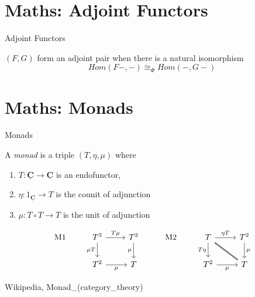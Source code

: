 \documentclass[10pt]{beamer}
\newcommand{\Cat}[1]{\ensuremath{\underline{\mathbf{#1}}}}
\theoremstyle{definition}
\theoremstyle{remark}
\numberwithin{equation}{section}
\begin{document}
\section{Maths: Adjoint Functors}

\begin{frame}[fragile]{Adjoint Functors}

$(F,G)$ form an adjoint pair when there is a natural isomorphism
  \[
  Hom(F-,-) \cong_{\Phi} Hom(-,G-)
  \]
  
\end{frame}


\section{Maths: Monads}

\begin{frame}[fragile]{Monads}

  A \emph{monad} is a triple $(T,\eta,\mu)$ where
  \begin{enumerate}
  \item $T: \Cat{C}\to \Cat{C}$ is an endofunctor,
  \item $\eta: 1_{\Cat{C}} \to T$ is the counit of adjunction
  \item $\mu: T \circ T \rightarrow T$ is the unit of adjunction
  \end{enumerate}

  \[
  \begin{tikzcd}
    \mathrm{M1} & T^3 \arrow{d}[swap]{\mu T}\arrow{r}{T\mu}  & T^2 \arrow{d}[swap]{\mu} &
    \mathrm{M2} & T \arrow{d}[swap]{T\eta}\arrow{r}{\eta T}\arrow[dash,double]{dr} & T^2 \arrow{d}{\mu} \\
    & T^2 \arrow{r}[swap]{\mu} & T & & T^2 \arrow{r}[swap]{\mu} & T
  \end{tikzcd}
  \]

  {\small Wikipedia, Monad\_(category\_theory)}
  
\end{frame}
\end{document}
